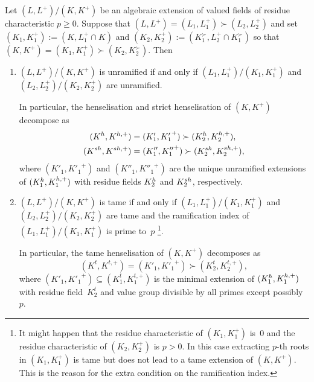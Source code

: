 \documentclass[10pt,a4paper]{amsart}
\newcommand{\rh}{{\rm h}}  %
\newcommand{\sh}{{\rm sh}}   %
\begin{document}
\begin{prop} \label{composition-tame}
    Let $(L,L^+)/(K,K^+)$ be an algebraic extension of valued fields of residue characteristic $p \ge 0$.
    Suppose that $(L,L^+) = (L_1,L_1^+) \succ (L_2,L_2^+)$ and set $(K_1,K_1^+) := (K,L_1^+ \cap K)$ and $(K_2,K_2^+) := (K_1^\succ,L_2^+ \cap K_1^\succ)$ so that $(K,K^+) = (K_1,K_1^+) \succ (K_2,K_2^\succ)$.
    Then
    \begin{enumerate}[ref=(\arabic*)]
        \item \label{lemitem:composition etale}
        $(L,L^+)/(K,K^+)$ is unramified if and only if $(L_1,L_1^+)/(K_1,K_1^+)$ and $(L_2,L_2^+)/(K_2,K_2^+)$ are unramified.
        
        In particular, the henselisation and strict henselisation of $(K,K^+)$ decompose as
        \begin{align*}
            (K^\rh,K^{\rh,+}) &= (K'_1,{K'_1}^+) \succ (K_2^\rh,K_2^{\rh,+}),   \\
            (K^\sh,K^{\sh,+}) &= (K''_1,{K''_1}^+) \succ (K_2^\sh,K_2^{\sh,+}),
        \end{align*}
        where $(K'_1,{K'_1}^+)$ and $(K''_1,{K''_1}^+)$ are the unique unramified extensions of $(K_1^\rh,K_1^{\rh,+})$ with residue fields $K_2^\rh$ and $K_2^\sh$, respectively.
        \item \label{lemitem:composition tame}
        $(L,L^+)/(K,K^+)$ is tame if and only if $(L_1,L_1^+)/(K_1,K_1^+)$ and $(L_2,L_2^+)/(K_2,K_2^+)$ are tame and the ramification index of $(L_1,L_1^+)/(K_1,K_1^+)$ is prime to~$p$ \footnote{It might happen that the residue characteristic of $(K_1,K_1^+)$ is~$0$ and the residue characteristic of $(K_2,K_2^+)$ is $p > 0$.
        In this case extracting $p$-th roots in $(K_1,K_1^+)$ is tame but does not lead to a tame extension of $(K,K^+)$.
        This is the reason for the extra condition on the ramification index.}.

        In particular, the tame henselisation of $(K,K^+)$ decomposes as
        \[
            (K^t,K^{t,+}) = (K'_1,{K'_1}^+) \succ (K_2^t,K_2^{t,+}),
        \]
         where $(K'_1,{K'_1}^+) \subseteq (K_1^t,K_1^{t,+})$ is the minimal extension of $(K_1^\rh,K_1^{\rh,+})$ with residue field~$K_2^t$ and value group divisible by all primes except possibly~$p$.
    \end{enumerate}
\end{prop}
\end{document}
